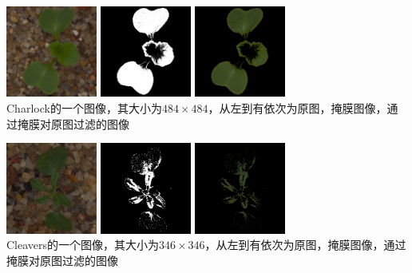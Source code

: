 \begin{center}
\includegraphics[width=30mm,height=30mm]{../figures/Charlock_0a7e1ca41.png} 
\includegraphics[width=30mm,height=30mm]{../figures/Charlock_0a7e1ca41_mask.png} 	
\includegraphics[width=30mm,height=30mm]{../figures/Charlock_0a7e1ca41_res.png} 	\\
Charlock的一个图像，其大小为$484\times 484$，从左到有依次为原图，掩膜图像，通过掩膜对原图过滤的图像
\end{center}
\begin{center}
\includegraphics[width=30mm,height=30mm]{../figures/Cleavers_0a1e622bc.png} 
\includegraphics[width=30mm,height=30mm]{../figures/Cleavers_0a1e622bc_mask.png} 	
\includegraphics[width=30mm,height=30mm]{../figures/Cleavers_0a1e622bc_res.png} 	\\
Cleavers的一个图像，其大小为$346\times 346$，从左到有依次为原图，掩膜图像，通过掩膜对原图过滤的图像
\end{center}

